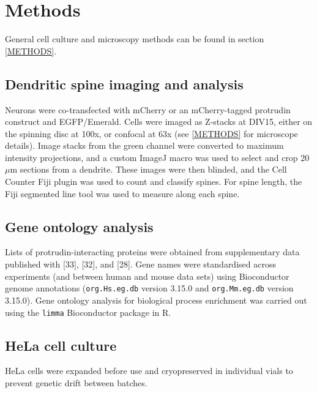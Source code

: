 \documentclass[
  12pt,
  a4paper,
]{book}
\begin{document}
\hypertarget{methods-1}{%
\section{Methods}\label{methods-1}}

General cell culture and microscopy methods can be found in section \ref{METHODS}.

\hypertarget{dendritic-spine-imaging-and-analysis}{%
\subsection{Dendritic spine imaging and analysis}\label{dendritic-spine-imaging-and-analysis}}

Neurons were co-transfected with mCherry or an mCherry-tagged protrudin construct and EGFP/Emerald. Cells were imaged as Z-stacks at DIV15, either on the spinning disc at 100x, or confocal at 63x (see \ref{METHODS} for microscope details). Image stacks from the green channel were converted to maximum intensity projections, and a custom ImageJ macro was used to select and crop 20\(\mu\)m sections from a dendrite. These images were then blinded, and the Cell Counter Fiji plugin was used to count and classify spines. For spine length, the Fiji segmented line tool was used to measure along each spine.

\hypertarget{gene-ontology-analysis}{%
\subsection{Gene ontology analysis}\label{gene-ontology-analysis}}

Lists of protrudin-interacting proteins were obtained from supplementary data published with {[}33{]}, {[}32{]}, and {[}28{]}. Gene names were standardised across experiments (and between human and mouse data sets) using Bioconductor genome annotations (\texttt{org.Hs.eg.db} version 3.15.0 and \texttt{org.Mm.eg.db} version 3.15.0). Gene ontology analysis for biological process enrichment was carried out using the \texttt{limma} Bioconductor package in R.

\hypertarget{hela-cell-culture}{%
\subsection{HeLa cell culture}\label{hela-cell-culture}}

HeLa cells were expanded before use and cryopreserved in individual vials to prevent genetic drift between batches.
\end{document}
